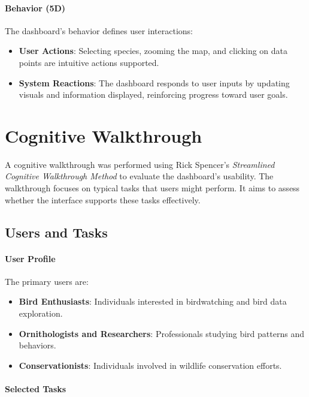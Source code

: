 \paragraph{Behavior (5D)}

The dashboard's behavior defines user interactions:

\begin{itemize} 
    \item \textbf{User Actions}: Selecting species, zooming the map, and clicking on data points are intuitive actions supported. 
    \item \textbf{System Reactions}: The dashboard responds to user inputs by updating visuals and information displayed, reinforcing progress toward user goals. 
\end{itemize}

\section{Cognitive Walkthrough}

A cognitive walkthrough was performed using Rick Spencer's \textit{Streamlined Cognitive Walkthrough Method} \cite{spencerStreamlinedCognitiveWalkthrough2000} to evaluate the dashboard's usability. The walkthrough focuses on typical tasks that users might perform. It aims to assess whether the interface supports these tasks effectively.

\subsection{Users and Tasks}

\paragraph{User Profile}

The primary users are:

\begin{itemize} 
    \item \textbf{Bird Enthusiasts}: Individuals interested in birdwatching and bird data exploration. 
    \item 
    \textbf{Ornithologists and Researchers}: Professionals studying bird patterns and behaviors. 
    \item \textbf{Conservationists}: Individuals involved in wildlife conservation efforts. 
\end{itemize}

\paragraph{Selected Tasks}

